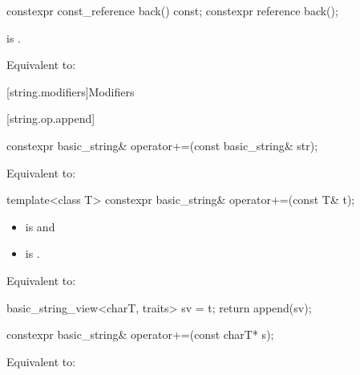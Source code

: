 %
\begin{itemdecl}
constexpr const_reference back() const;
constexpr reference back();
\end{itemdecl}

\begin{itemdescr}
\pnum
\hardexpects
{} is .

\pnum
\effects
Equivalent to: 
\end{itemdescr}

[string.modifiers]{Modifiers}

[string.op.append]{}

%
\begin{itemdecl}
constexpr basic_string& operator+=(const basic_string& str);
\end{itemdecl}

\begin{itemdescr}
\pnum
\effects
Equivalent to: 


\end{itemdescr}

%
\begin{itemdecl}
template<class T>
  constexpr basic_string& operator+=(const T& t);
\end{itemdecl}

\begin{itemdescr}
\pnum
\constraints
\begin{itemize}
\item
{} is
 and
\item
{} is
.
\end{itemize}

\pnum
\effects
Equivalent to:
\begin{codeblock}
basic_string_view<charT, traits> sv = t;
return append(sv);
\end{codeblock}
\end{itemdescr}

%
\begin{itemdecl}
constexpr basic_string& operator+=(const charT* s);
\end{itemdecl}

\begin{itemdescr}
\pnum
\effects
Equivalent to: 
\end{itemdescr}

